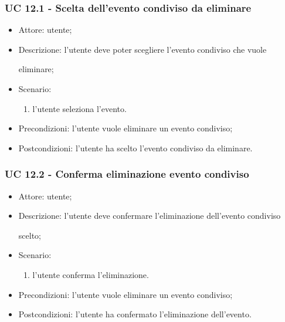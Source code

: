 \subsubsection{UC 12.1 - Scelta dell'evento condiviso da eliminare} \label{sec: UC 12.1}
\begin{itemize}
    \item Attore: utente;
    \item Descrizione: l'utente deve poter scegliere l'evento condiviso che vuole \par eliminare;
    \item Scenario:
        \begin{enumerate}
        \item l'utente seleziona l'evento.
        \end{enumerate}
    
    \item Precondizioni: l'utente vuole eliminare un evento condiviso;
    \item Postcondizioni: l'utente ha scelto l'evento condiviso da eliminare.
\end{itemize}


\subsubsection{UC 12.2 - Conferma eliminazione evento condiviso} \label{sec: UC 12.2}
\begin{itemize}
    \item Attore: utente;
    \item Descrizione: l'utente deve confermare l'eliminazione dell'evento condiviso \par scelto;
    \item Scenario:
        \begin{enumerate}
        \item l'utente conferma l'eliminazione.
        \end{enumerate}
    
    \item Precondizioni: l'utente vuole eliminare un evento condiviso;
    \item Postcondizioni: l'utente ha confermato l'eliminazione dell'evento.
\end{itemize}


